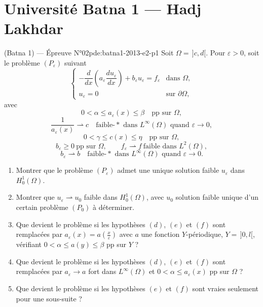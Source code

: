 \section{Université Batna 1 --- Hadj Lakhdar}
\begin{problem}{(Batna 1) — Épreuve N°02}{pde:batna1-2013-e2-p1}
Soit $\Omega=\,]c,d[$. Pour $\varepsilon>0$, soit le problème $(P_\varepsilon)$ suivant
$$\begin{cases}-\dfrac{d}{dx}\left(a_\varepsilon\dfrac{du_\varepsilon}{dx}\right)+b_\varepsilon u_\varepsilon=f_\varepsilon & \text{dans } \Omega,\\ u_\varepsilon=0 & \text{sur } \partial\Omega,\end{cases}$$
avec
$$0<\alpha\leq a_\varepsilon(x)\leq\beta\quad\text{pp sur }\Omega,\tag{d}$$
$$\frac{1}{a_\varepsilon(x)}\rightharpoonup c\quad\text{faible-}*\text{ dans }L^\infty(\Omega)\text{ quand }\varepsilon\to0,\tag{e}$$
$$0<\gamma\leq c(x)\leq\eta\quad\text{pp sur }\Omega,\tag{f}$$
$$b_\varepsilon\geq0\ \text{pp sur }\Omega,\qquad f_\varepsilon\rightharpoonup f\ \text{faible dans }L^2(\Omega),\tag{g}$$
$$b_\varepsilon\rightharpoonup b\quad\text{faible-}*\text{ dans }L^\infty(\Omega)\text{ quand }\varepsilon\to0.\tag{h}$$
\begin{enumerate}\item Montrer que le problème $(P_\varepsilon)$ admet une unique solution faible $u_\varepsilon$ dans $H_0^1(\Omega)$.\item Montrer que $u_\varepsilon\rightharpoonup u_0$ faible dans $H_0^1(\Omega)$, avec $u_0$ solution faible unique d'un certain problème $(P_0)$ à déterminer.\item Que devient le problème si les hypothèses $(d)$, $(e)$ et $(f)$ sont remplacées par $a_\varepsilon(x)=a\left(\frac{x}{\varepsilon}\right)$ avec $a$ une fonction $Y$-périodique, $Y=\,]0,l[$, vérifiant $0<\alpha\leq a(y)\leq\beta$ pp sur $Y$ ?\item Que devient le problème si les hypothèses $(d)$, $(e)$ et $(f)$ sont remplacées par $a_\varepsilon\to a$ fort dans $L^\infty(\Omega)$ et $0<\alpha\leq a_\varepsilon(x)$ pp sur $\Omega$ ?\item Que devient le problème si les hypothèses $(e)$ et $(f)$ sont vraies seulement pour une sous-suite ?\end{enumerate}
\end{problem}
\newpage

